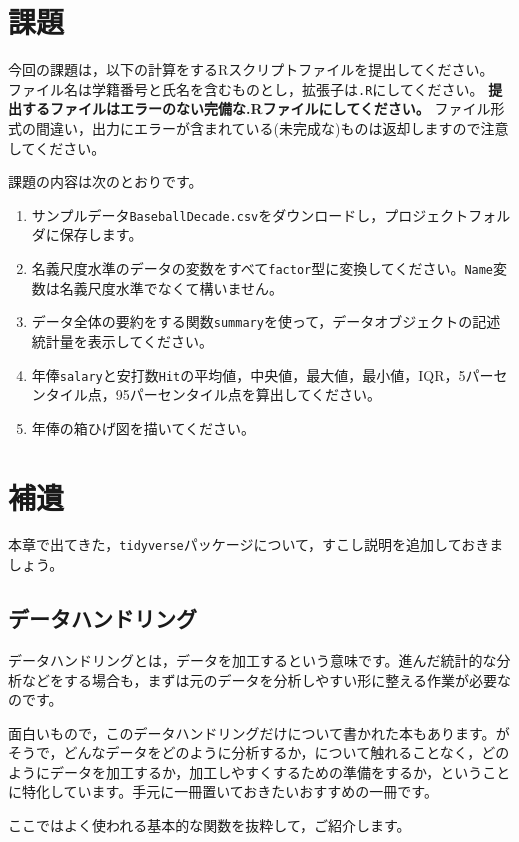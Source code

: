 \documentclass{ltjsbook}
\begin{document}
\section{課題}
今回の課題は，以下の計算をするRスクリプトファイルを提出してください。
ファイル名は学籍番号と氏名を含むものとし，拡張子は\verb|.R|にしてください。
\textbf{提出するファイルはエラーのない完備な.Rファイルにしてください。}
ファイル形式の間違い，出力にエラーが含まれている(未完成な)ものは返却しますので注意してください。

課題の内容は次のとおりです。
\begin{enumerate}
	\item サンプルデータ\texttt{BaseballDecade.csv}をダウンロードし，プロジェクトフォルダに保存します。
	\item 名義尺度水準のデータの変数をすべて\verb|factor|型に変換してください。\verb|Name|変数は名義尺度水準でなくて構いません。
	\item データ全体の要約をする関数\verb|summary|を使って，データオブジェクトの記述統計量を表示してください。
	\item 年俸\verb|salary|と安打数\verb|Hit|の平均値，中央値，最大値，最小値，IQR，5パーセンタイル点，95パーセンタイル点を算出してください。
	\item 年俸の箱ひげ図を描いてください。
\end{enumerate}


\newpage
\section{補遺}
本章で出てきた，\verb|tidyverse|パッケージについて，すこし説明を追加しておきましょう。

\subsection{データハンドリング}
\label{dataHandling}

データハンドリングとは，データを加工するという意味です。進んだ統計的な分析などをする場合も，まずは元のデータを分析しやすい形に整える作業が必要なのです。

面白いもので，このデータハンドリングだけについて書かれた本もあります。\textcite{Kinosady2021}がそうで，どんなデータをどのように分析するか，について触れることなく，どのようにデータを加工するか，加工しやすくするための準備をするか，ということに特化しています。手元に一冊置いておきたいおすすめの一冊です。

ここではよく使われる基本的な関数を抜粋して，ご紹介します。
\end{document}
